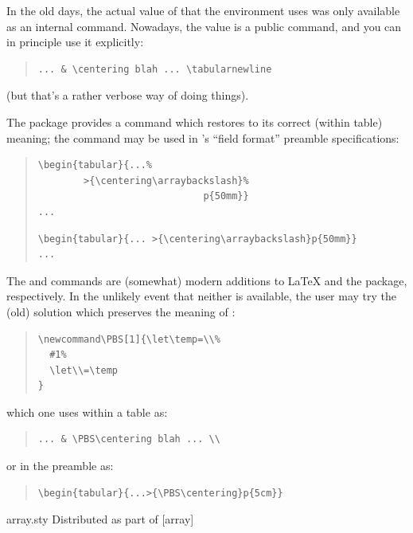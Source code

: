In the old days, the actual value of \texttt{\bsbs } that the
 environment uses was only available as an
internal command.  Nowadays, the value is a public command, and you
can in principle use it explicitly:
\begin{quote}
\begin{verbatim}
... & \centering blah ... \tabularnewline
\end{verbatim}
\end{quote}
(but that's a rather verbose way of doing things).

The  package provides a command 
which restores \texttt{\bsbs } to its correct (within table) meaning;
the command may be used in 's ``field format'' preamble
specifications:
\begin{quote}
\begin{narrowversion}
\begin{verbatim}
\begin{tabular}{...%
        >{\centering\arraybackslash}%
                             p{50mm}}
...
\end{verbatim}
\end{narrowversion}
\begin{wideversion}
\begin{verbatim}
\begin{tabular}{... >{\centering\arraybackslash}p{50mm}}
...
\end{verbatim}
\end{wideversion}
\end{quote}

The  and  commands are
(somewhat) modern additions to \LaTeX{} and the 
package, respectively.  In the unlikely event that neither is
available, the user may try the (old) solution which preserves the
meaning of \texttt{\bsbs }:
\begin{quote}
\begin{verbatim}
\newcommand\PBS[1]{\let\temp=\\%
  #1%
  \let\\=\temp
}
\end{verbatim}
\end{quote}
which one uses within a table as:
\begin{quote}
\begin{verbatim}
... & \PBS\centering blah ... \\
\end{verbatim}
\end{quote}
or in the preamble as:
\begin{quote}
\begin{verbatim}
\begin{tabular}{...>{\PBS\centering}p{5cm}}
\end{verbatim}
\end{quote}
\begin{ctanrefs}
\item[array.sty]Distributed as part of [array]
\end{ctanrefs}

